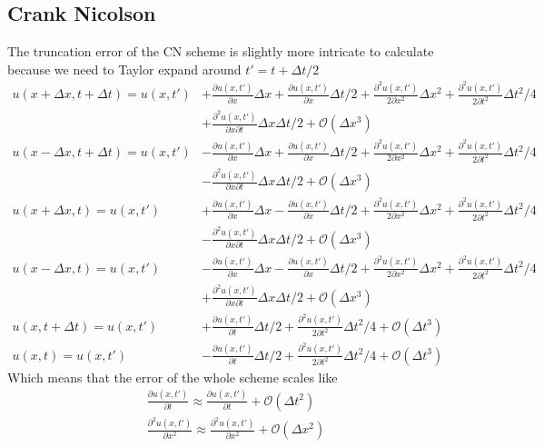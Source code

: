 \documentclass[a4paper,english, 10pt, twoside]{article}
\begin{document}
\subsection{Crank Nicolson}
The truncation error of the CN scheme is slightly more intricate to calculate because we need to Taylor expand around 
$t' = t + \Delta t/2$
\begin{align*}
u(x+\Delta x,t+\Delta t) = u(x,t') &+ \frac{\partial u(x,t')}{\partial x}\Delta x + \frac{\partial u(x,t')}{\partial x}\Delta t/2
+ \frac{\partial^2u(x,t')}{2\partial x^2}\Delta x^2 + \frac{\partial^2u(x,t')}{2\partial t^2}\Delta t^2/4 \\
&+\frac{\partial^2u(x,t')}{\partial x\partial t}\Delta x\Delta t/2 + \mathcal{O}(\Delta x^3) \\
u(x-\Delta x,t+\Delta t) = u(x,t') &- \frac{\partial u(x,t')}{\partial x}\Delta x + \frac{\partial u(x,t')}{\partial x}\Delta t/2
+ \frac{\partial^2u(x,t')}{2\partial x^2}\Delta x^2 + \frac{\partial^2u(x,t')}{2\partial t^2}\Delta t^2/4 \\
&-\frac{\partial^2u(x,t')}{\partial x\partial t}\Delta x\Delta t/2 + \mathcal{O}(\Delta x^3) \\
u(x+\Delta x,t) = u(x,t') &+ \frac{\partial u(x,t')}{\partial x}\Delta x - \frac{\partial u(x,t')}{\partial x}\Delta t/2
+ \frac{\partial^2u(x,t')}{2\partial x^2}\Delta x^2 + \frac{\partial^2u(x,t')}{2\partial t^2}\Delta t^2/4 \\
&-\frac{\partial^2u(x,t')}{\partial x\partial t}\Delta x\Delta t/2 + \mathcal{O}(\Delta x^3)\\
u(x-\Delta x,t) = u(x,t') &- \frac{\partial u(x,t')}{\partial x}\Delta x - \frac{\partial u(x,t')}{\partial x}\Delta t/2
+ \frac{\partial^2u(x,t')}{2\partial x^2}\Delta x^2 + \frac{\partial^2u(x,t')}{2\partial t^2}\Delta t^2/4 \\
&+\frac{\partial^2u(x,t')}{\partial x\partial t}\Delta x\Delta t/2 + \mathcal{O}(\Delta x^3)\\
u(x,t+\Delta t) = u(x,t') &+\frac{\partial u(x,t')}{\partial t}\Delta t/2 + \frac{\partial^2 u(x,t')}{2\partial t^2}\Delta t^2/4 
+ \mathcal{O}(\Delta t^3) \\
u(x,t) = u(x,t') &-\frac{\partial u(x,t')}{\partial t}\Delta t/2 + \frac{\partial^2 u(x,t')}{2\partial t^2}\Delta t^2/4 
+ \mathcal{O}(\Delta t^3)
\end{align*}
Which means that the error of the whole scheme scales like
\begin{align*}
 \frac{\partial u(x,t')}{\partial t} \approx \frac{\partial u(x,t')}{\partial t} + \mathcal{O}(\Delta t^2)\\
 \frac{\partial^2 u(x,t')}{\partial x^2} \approx\frac{\partial^2 u(x,t')}{\partial x^2}+ \mathcal{O}(\Delta x^2)
\end{align*}
\end{document}
